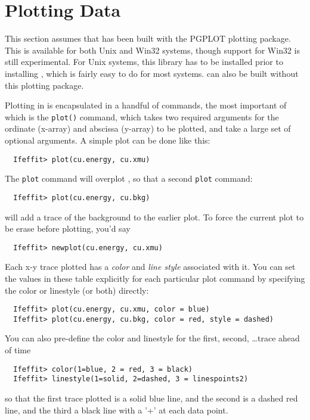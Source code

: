\documentclass[11pt]{article}
\begin{document}
\clearpage
\section{Plotting Data}\label{s:plotting}

This section assumes that {\ifeffit} has been built with the PGPLOT
plotting package.  This is available for both Unix and Win32 systems,
though support for Win32 is still experimental.  For Unix systems, this
library has to be installed prior to installing {\ifeffit}, which is fairly
easy to do for most systems.  {\ifeffit} can also be built without this
plotting package.

Plotting in {\ifeffit} is encapsulated in a handful of commands, the most
important of which is the {\tt{plot()}} command, which takes two required
arguments for the ordinate (x-array) and abscissa (y-array) to be plotted,
and take a large set of optional arguments.  A simple plot can be done like
this:
{\small\begin{verbatim}
  Ifeffit> plot(cu.energy, cu.xmu)
\end{verbatim}}\noindent
The {\tt{plot}} command will overplot , so that a second {\tt{plot}}
command:
{\small\begin{verbatim}
  Ifeffit> plot(cu.energy, cu.bkg)
\end{verbatim}}\noindent
will add a trace of the background to the earlier plot.  To force the
current plot to be erase before plotting, you'd say 
{\small\begin{verbatim}
  Ifeffit> newplot(cu.energy, cu.xmu)
\end{verbatim}}\noindent
Each x-y trace plotted has a {\emph{color}} and {\emph{line style}}
associated with it.  You can set the values in these table explicitly for
each particular plot command by specifying the color or linestyle (or both)
directly:
{\small\begin{verbatim}
  Ifeffit> plot(cu.energy, cu.xmu, color = blue)
  Ifeffit> plot(cu.energy, cu.bkg, color = red, style = dashed)
\end{verbatim}
}\noindent
You can also pre-define the color and linestyle for the first, second,
\dots trace ahead of time 
{\small\begin{verbatim}
  Ifeffit> color(1=blue, 2 = red, 3 = black)
  Ifeffit> linestyle(1=solid, 2=dashed, 3 = linespoints2)
\end{verbatim}
}\noindent
so that the first trace plotted is a solid blue line, and the second is a
dashed red line, and the third a black line with a '+' at each data point.
\end{document}
